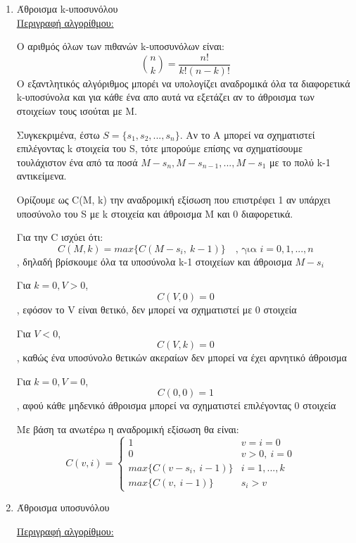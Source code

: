 \documentclass[12pt]{article}
\begin{document}
    \begin{enumerate}
        \item Άθροισμα k-υποσυνόλου\\[15pt]
        \underline{Περιγραφή αλγορίθμου:}

            Ο αριθμός όλων των πιθανών k-υποσυνόλων είναι:
             \[\binom{n}{k} = \frac{n!}{k!(n-k)!}\]
            Ο εξαντλητικός αλγόριθμος μπορέι να υπολογίζει αναδρομικά όλα τα διαφορετικά k-υποσύνολα
            και για κάθε ένα απο αυτά να εξετάζει αν το άθροισμα των στοιχείων τους ισούται με Μ.

            Συγκεκριμένα, έστω $S = \{s_1, s_2,..., s_n\}$. Αν το A μπορεί να σχηματιστεί επιλέγοντας k
            στοιχεία του S, τότε μπορούμε επίσης να σχηματίσουμε τουλάχιστον ένα από τα ποσά 
            $M-s_n, M-s_{n-1},..., M-s_1$ με το πολύ k-1 αντικείμενα. 
            
            Ορίζουμε ως C(M, k) την αναδρομική εξίσωση που 
            επιστρέφει 1 αν υπάρχει υποσύνολο του S με k στοιχεία και άθροισμα Μ και 0 διαφορετικά.

            Για την C ισχύει ότι:
            \[C(M,k) = max\{C(M-s_i, \: k-1)\}\quad \text{, για } i=0, 1,...,n\], δηλαδή βρίσκουμε όλα τα υποσύνολα k-1 στοιχείων και άθροισμα $M-s_i$ 

            Για $k=0, V>0$, \[C(V,0) = 0\], εφόσον το V είναι θετικό, δεν μπορεί να σχηματιστεί με 0 στοιχεία

            Για $V<0$, \[C(V,k) = 0\], καθώς ένα υποσύνολο θετικών ακεραίων δεν μπορεί να έχει αρνητικό άθροισμα

            Για $k=0, V=0$, \[C(0,0) = 1\], αφού κάθε μηδενικό άθροισμα μπορεί να σχηματιστεί επιλέγοντας 0 στοιχεία
            
            Με βάση τα ανωτέρω η αναδρομική εξίσωση θα είναι:
            \[ C(v, i) =\begin{cases} 
                1 & v = i =0 \\
                0 & v>0,\:i=0 \quad\\
                max\{C(v-s_i, \: i-1)\} &i=1,...,k\\
                max\{C(v, \: i-1)\} &s_i>v
                    \end{cases}
            \]

        \item Άθροισμα υποσυνόλου  
        
        \underline{Περιγραφή αλγορίθμου:}


\end{enumerate}
\end{document}
